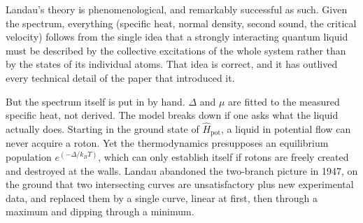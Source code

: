 Landau's theory is phenomenological, and remarkably successful as such. Given the spectrum, everything  (specific heat, normal density, second sound, the critical velocity) follows from the single idea that a strongly interacting quantum liquid must be described by the collective excitations of the whole system rather than by the states of its individual atoms. That idea is correct, and it has outlived every technical detail of the paper that introduced it.

But the spectrum itself is put in by hand. $\Delta$ and $\mu$ are fitted to the measured specific heat, not derived. The model breaks down if one asks what the liquid actually does. Starting in the ground state of $\hat H_\mathrm{pot}$, a liquid in potential flow can never acquire a roton. Yet the thermodynamics presupposes an equilibrium population $e^{(-\Delta/k_BT)}$, which can only establish itself if rotons are freely created and destroyed at the walls. Landau abandoned the two-branch picture in 1947, on the ground that two intersecting curves are unsatisfactory plus new experimental data, and replaced them by a single curve, linear at first, then through a maximum and dipping through a minimum. 

